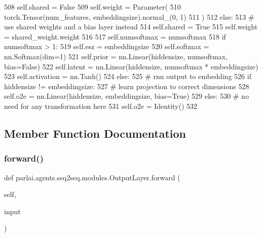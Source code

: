 \begin{DoxyCode}
508             self.shared = \textcolor{keyword}{False}
509             self.weight = Parameter(
510                 torch.Tensor(num\_features, embeddingsize).normal\_(0, 1)
511             )
512         \textcolor{keywordflow}{else}:
513             \textcolor{comment}{# use shared weights and a bias layer instead}
514             self.shared = \textcolor{keyword}{True}
515             self.weight = shared\_weight.weight
516 
517         self.numsoftmax = numsoftmax
518         \textcolor{keywordflow}{if} numsoftmax > 1:
519             self.esz = embeddingsize
520             self.softmax = nn.Softmax(dim=1)
521             self.prior = nn.Linear(hiddensize, numsoftmax, bias=\textcolor{keyword}{False})
522             self.latent = nn.Linear(hiddensize, numsoftmax * embeddingsize)
523             self.activation = nn.Tanh()
524         \textcolor{keywordflow}{else}:
525             \textcolor{comment}{# rnn output to embedding}
526             \textcolor{keywordflow}{if} hiddensize != embeddingsize:
527                 \textcolor{comment}{# learn projection to correct dimensions}
528                 self.o2e = nn.Linear(hiddensize, embeddingsize, bias=\textcolor{keyword}{True})
529             \textcolor{keywordflow}{else}:
530                 \textcolor{comment}{# no need for any transformation here}
531                 self.o2e = Identity()
532 
\end{DoxyCode}


\subsection{Member Function Documentation}
\mbox{\label{classparlai_1_1agents_1_1seq2seq_1_1modules_1_1OutputLayer_a730001f010633b53df7f7d96a75d8812}} 
\subsubsection{\texorpdfstring{forward()}{forward()}}
{\footnotesize\ttfamily def parlai.\+agents.\+seq2seq.\+modules.\+Output\+Layer.\+forward (\begin{DoxyParamCaption}\item[{}]{self,  }\item[{}]{input }\end{DoxyParamCaption})}

